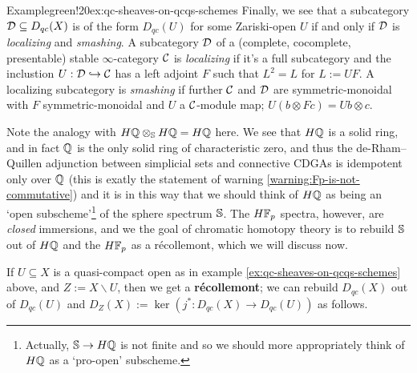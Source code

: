 \begin{env}{Example}{green!20}{ex:qc-sheaves-on-qcqs-schemes}
	Finally, we see that a subcategory $\Da \subseteq D_{qc}(X)$ is of the form $D_{qc}(U)$ for some Zariski-open $U$ if and only if $\Da$ is \textit{localizing} and \textit{smashing}. A subcategory $\Da$ of a (complete, cocomplete, presentable) stable $\infty$-category $\Ca$ is \textit{localizing} if it's a full subcategory and the inclustion $U : \Da \hookrightarrow \Ca$ has a left adjoint $F$ such that $L^2 = L$ for $L := UF$. A localizing subcategory is \textit{smashing} if further $\Ca$ and $\Da$ are symmetric-monoidal with $F$ symmetric-monoidal and $U$ a $\Ca$-module map; $U(b \otimes Fc) = Ub \otimes c$. 
\end{env}

Note the analogy with $H\Q \otimes_\S H\Q = H\Q$ here. We see that $H\Q$ is a solid ring, and in fact $\Q$ is the only solid ring of characteristic zero, and thus the de-Rham--Quillen adjunction between simplicial sets and connective CDGAs is idempotent only over $\Q$ (this is exatly the statement of warning \ref{warning:Fp-is-not-commutative}) and it is in this way that we should think of $H\Q$ as being an `open subscheme'\footnote{Actually, $\S \to H\Q$ is not finite and so we should more appropriately think of $H\Q$ as a `pro-open' subscheme.} of the sphere spectrum $\S$. The $H\F_p$ spectra, however, are \textit{closed} immersions, and we the goal of chromatic homotopy theory is to rebuild $\S$ out of $H\Q$ and the $H\F_p$ as a r\'ecollemont, which we will discuss now. 

If $U \subseteq X$ is a quasi-compact open as in example \ref{ex:qc-sheaves-on-qcqs-schemes} above, and $Z := X \backslash U$, then we get a \textbf{r\'ecollemont}; we can rebuild $D_{qc}(X)$ out of $D_{qc}(U)$ and $D_Z(X) := \ker(j^\ast : D_{qc}(X) \to D_{qc}(U))$ as follows. 






















